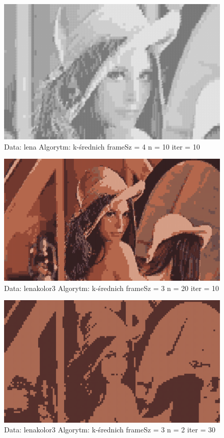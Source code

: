 \documentclass{classrep}
\begin{document}
{{{\begin{figure}[h!]
\centering
 \includegraphics[width=12cm]{img/kmeans_1.png}
 \vspace{-0.0cm}
 \caption{Data: lena Algorytm: k-średnich frameSz = 4 n = 10 iter = 10
}
\end{figure}

\newpage

\begin{figure}[h!]
\centering
 \includegraphics[width=12cm]{img/kmeans_2.png}
 \vspace{-0.0cm}
 \caption{Data: lenakolor3 Algorytm: k-średnich frameSz = 3 n = 20 iter = 10
}
\end{figure}

\begin{figure}[h!]
\centering
 \includegraphics[width=12cm]{img/kmeans_4.png}
 \vspace{-0.0cm}
 \caption{Data: lenakolor3 Algorytm: k-średnich frameSz = 3 n = 2 iter = 30
}
\end{figure}

}}}
\end{document}
